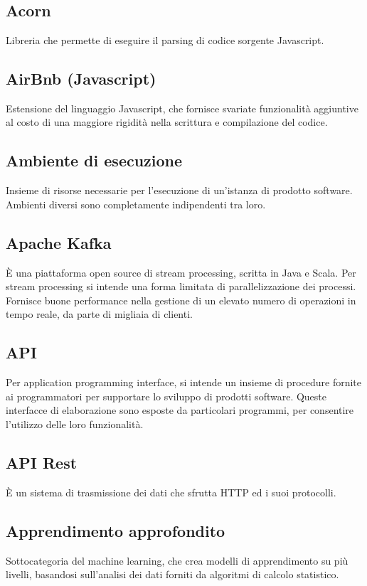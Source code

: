   \section[A]{}
  	\subsection*{Acorn}
  	Libreria che permette di eseguire il parsing di codice sorgente Javascript.
  	\subsection*{AirBnb (Javascript)}
  	Estensione del linguaggio Javascript, che fornisce svariate funzionalità aggiuntive al costo di una maggiore rigidità nella scrittura e compilazione del codice.
	\subsection*{Ambiente di esecuzione}
	Insieme di risorse necessarie per l'esecuzione di un'istanza di prodotto software. Ambienti diversi sono completamente indipendenti tra loro.
	\subsection*{Apache Kafka}
	È una piattaforma open source di stream processing, scritta in Java e Scala. Per stream processing si intende una forma limitata di parallelizzazione dei processi. Fornisce buone performance nella gestione di un elevato numero di operazioni in tempo reale, da parte di migliaia di clienti.
	\subsection*{API}
	Per application programming interface, si intende un insieme di procedure fornite ai programmatori per supportare lo sviluppo di prodotti software. Queste interfacce di elaborazione sono esposte da particolari programmi, per consentire l’utilizzo delle loro funzionalità.
	\subsection*{API Rest}
	È un sistema di trasmissione dei dati che sfrutta HTTP ed i suoi protocolli.
	\subsection*{Apprendimento approfondito}
	Sottocategoria del machine learning, che crea modelli di apprendimento su più livelli, basandosi sull’analisi dei dati forniti da algoritmi di calcolo statistico.
